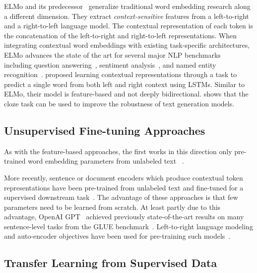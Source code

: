 \documentclass[11pt,a4paper]{article}
\begin{document}
ELMo and its predecessor~\cite{peters-etal:2017:_semi, peters-etal:2018:_deep} generalize traditional word embedding research along a different dimension. They extract \emph{context-sensitive} features from a left-to-right and a right-to-left language model. The contextual representation of each token is the concatenation of the left-to-right and right-to-left representations. When integrating contextual word embeddings with existing task-specific architectures, ELMo advances the state of the art for several major NLP benchmarks~\cite{peters-etal:2018:_deep} including question answering~\cite{rajpurkar-etal:2016:_squad}, sentiment analysis~\cite{socher-etal:2013:_recur}, and named entity recognition~\cite{tjong-de:2003}.
\citet{melamud2016context2vec} proposed learning contextual representations through a task to predict a single word from both left and right context
using LSTMs. Similar to ELMo, their model is feature-based and not deeply bidirectional. 
\citet{fedus2018maskgan} shows that the cloze task can be used to improve the robustness of text generation models. 




\subsection{Unsupervised Fine-tuning Approaches}

As with the feature-based approaches, the first works in this direction only pre-trained word embedding parameters from unlabeled text ~\cite{collobert-weston:2008}.  

More recently, sentence or document encoders which produce contextual token representations have been pre-trained from unlabeled text and fine-tuned for a supervised downstream task~\cite{dai-le:2015:_semi, howard-ruder:2018, radford-etal:2018}.  The advantage of these approaches is that few parameters need to be learned from scratch. At least partly due to this advantage, OpenAI GPT~\cite{radford-etal:2018} achieved previously state-of-the-art results on many sentence-level tasks from the GLUE benchmark~\cite{wang-etal:2018:_glue}.  Left-to-right language modeling and auto-encoder objectives have been used for pre-training such models~\cite{howard-ruder:2018, radford-etal:2018,dai-le:2015:_semi}.





\subsection{Transfer Learning from Supervised Data}
\end{document}
